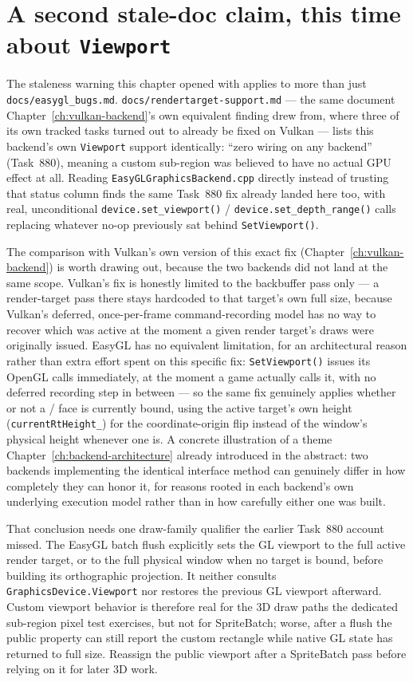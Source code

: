 \section{A second stale-doc claim, this time about \texttt{Viewport}}

The staleness warning this chapter opened with applies to more than just
\texttt{docs/easygl\_bugs.md}. \texttt{docs/rendertarget-support.md} --- the same document
Chapter~\ref{ch:vulkan-backend}'s own equivalent finding drew from, where three of its own
tracked tasks turned out to already be fixed on Vulkan --- lists this backend's own
\texttt{Viewport} support identically: ``zero wiring on any backend'' (Task~880), meaning a
custom sub-region  was believed to have no actual GPU effect at all.
Reading \texttt{EasyGLGraphicsBackend.cpp} directly instead of trusting that status column
finds the same Task~880 fix already landed here too, with real, unconditional
\texttt{device.set\_viewport()} / \texttt{device.set\_depth\_range()} calls replacing whatever
no-op previously sat behind \texttt{SetViewport()}.

The comparison with Vulkan's own version of this exact fix (Chapter~\ref{ch:vulkan-backend})
is worth drawing out, because the two backends did not land at the same scope. Vulkan's fix is
honestly limited to the backbuffer pass only --- a render-target pass there stays hardcoded to
that target's own full size, because Vulkan's deferred, once-per-frame command-recording model
has no way to recover which  was active at the moment a given render
target's draws were originally issued. EasyGL has no equivalent limitation, for an
architectural reason rather than extra effort spent on this specific fix: \texttt{SetViewport()}
issues its OpenGL calls immediately, at the moment a game actually calls it, with no deferred
recording step in between --- so the same fix genuinely applies whether or not a
 /  face is currently bound, using the active
target's own height (\texttt{currentRtHeight\_}) for the coordinate-origin flip instead of the
window's physical height whenever one is. A concrete illustration of a theme
Chapter~\ref{ch:backend-architecture} already introduced in the abstract: two backends
implementing the identical interface method can genuinely differ in how completely they can
honor it, for reasons rooted in each backend's own underlying execution model rather than in
how carefully either one was built.

That conclusion needs one draw-family qualifier the earlier Task~880 account missed.
The EasyGL batch flush explicitly sets the GL viewport to the full active render target, or
to the full physical window when no target is bound, before building its orthographic
projection. It neither consults
\texttt{GraphicsDevice.Viewport} nor restores the previous GL viewport afterward. Custom
viewport behavior is therefore real for the 3D draw paths the dedicated sub-region pixel test
exercises, but not for SpriteBatch; worse, after a flush the public property can still report
the custom rectangle while native GL state has returned to full size. Reassign the public
viewport after a SpriteBatch pass before relying on it for later 3D work.

